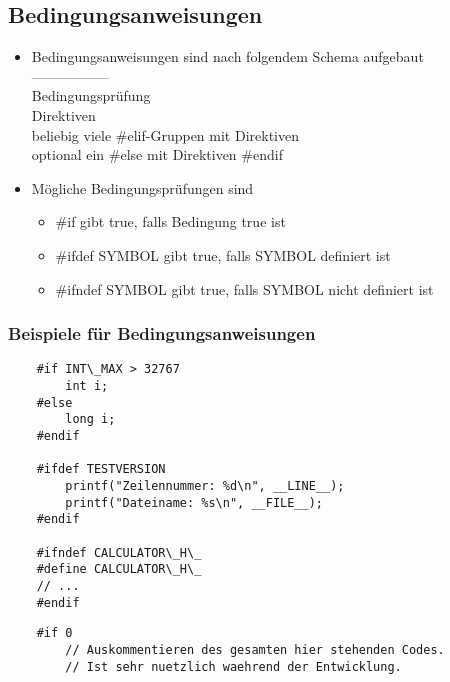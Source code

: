 \subsection{Bedingungsanweisungen}
\label{sec:Bedingungsanweisungen}
\begin{itemize}
	\item Bedingungsanweisungen sind nach folgendem Schema aufgebaut\\
	-----------------\\
	Bedingungsprüfung\\
	Direktiven\\
	beliebig viele \#elif-Gruppen mit Direktiven\\
	optional ein \#else mit Direktiven
	\#endif
	\item Mögliche Bedingungsprüfungen sind
	\begin{itemize}
		\item \#if gibt true, falls Bedingung true ist
		\item \#ifdef SYMBOL gibt true, falls SYMBOL definiert ist
		\item \#ifndef SYMBOL gibt true, falls SYMBOL nicht definiert ist
	\end{itemize}
\end{itemize}

\subsubsection{Beispiele für Bedingungsanweisungen}
\label{sec:Beispiele für Bedingungsanweisungen}
\noindent
\begin{minipage}{\linewidth}
	\begin{lstlisting}
	#if INT\_MAX > 32767
		int i;
	#else
		long i;
	#endif
	
	#ifdef TESTVERSION
		printf("Zeilennummer: %d\n", __LINE__);
		printf("Dateiname: %s\n", __FILE__);
	#endif
	
	#ifndef CALCULATOR\_H\_
	#define CALCULATOR\_H\_
	// ...
	#endif
	\end{lstlisting}
\end{minipage}
\noindent
\begin{minipage}{\linewidth}
	\begin{lstlisting}
	#if 0
		// Auskommentieren des gesamten hier stehenden Codes.
		// Ist sehr nuetzlich waehrend der Entwicklung.
	\end{lstlisting}
\end{minipage}

